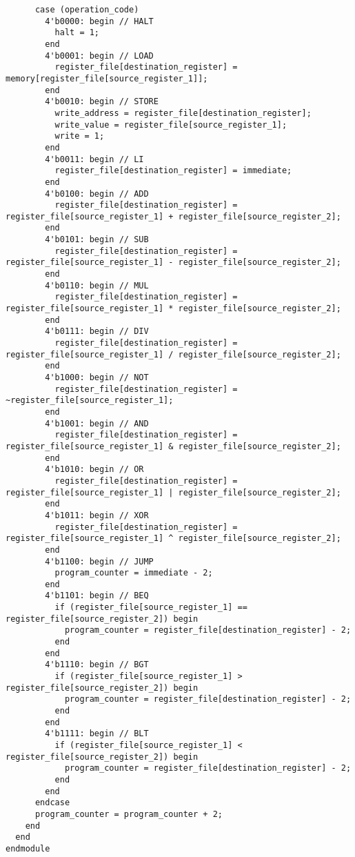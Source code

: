 \documentclass{article}
\begin{document}
\begin{lstlisting}
      case (operation_code)
        4'b0000: begin // HALT
          halt = 1;
        end
        4'b0001: begin // LOAD
          register_file[destination_register] = memory[register_file[source_register_1]];
        end
        4'b0010: begin // STORE
          write_address = register_file[destination_register];
          write_value = register_file[source_register_1];
          write = 1;
        end
        4'b0011: begin // LI
          register_file[destination_register] = immediate;
        end
        4'b0100: begin // ADD
          register_file[destination_register] = register_file[source_register_1] + register_file[source_register_2];
        end
        4'b0101: begin // SUB
          register_file[destination_register] = register_file[source_register_1] - register_file[source_register_2];
        end
        4'b0110: begin // MUL
          register_file[destination_register] = register_file[source_register_1] * register_file[source_register_2];
        end
        4'b0111: begin // DIV
          register_file[destination_register] = register_file[source_register_1] / register_file[source_register_2];
        end
        4'b1000: begin // NOT
          register_file[destination_register] = ~register_file[source_register_1];
        end
        4'b1001: begin // AND
          register_file[destination_register] = register_file[source_register_1] & register_file[source_register_2];
        end
        4'b1010: begin // OR
          register_file[destination_register] = register_file[source_register_1] | register_file[source_register_2];
        end
        4'b1011: begin // XOR
          register_file[destination_register] = register_file[source_register_1] ^ register_file[source_register_2];
        end
        4'b1100: begin // JUMP
          program_counter = immediate - 2;
        end
        4'b1101: begin // BEQ
          if (register_file[source_register_1] == register_file[source_register_2]) begin
            program_counter = register_file[destination_register] - 2;
          end
        end
        4'b1110: begin // BGT
          if (register_file[source_register_1] > register_file[source_register_2]) begin
            program_counter = register_file[destination_register] - 2;
          end
        end
        4'b1111: begin // BLT
          if (register_file[source_register_1] < register_file[source_register_2]) begin
            program_counter = register_file[destination_register] - 2;
          end
        end
      endcase
      program_counter = program_counter + 2;
    end
  end
endmodule
\end{lstlisting}
\end{document}

